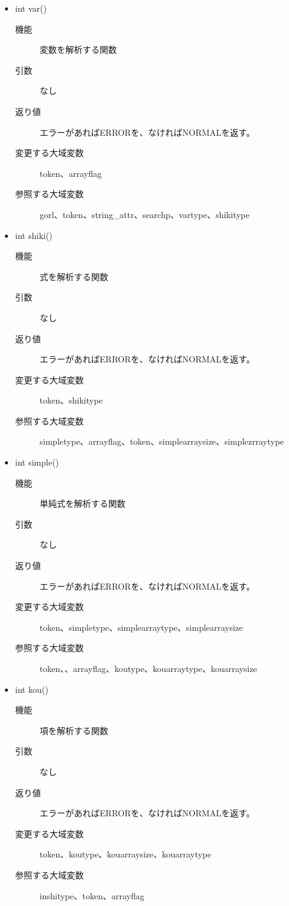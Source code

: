 \documentclass{jarticle}
\begin{document}
\begin{itemize}
\begin{description}
\item[変更する大域変数]token
\item[参照する大域変数]vartype、shikitype、token
\end{description}
\item int var()
\begin{description}
\item[機能]変数を解析する関数
\item[引数]なし
\item[返り値]エラーがあればERRORを、なければNORMALを返す。
\item[変更する大域変数]token、arrayflag
\item[参照する大域変数]gorl、token、string\_attr、searchp、vartype、shikitype
\end{description}
\item int shiki()
\begin{description}
\item[機能]式を解析する関数
\item[引数]なし
\item[返り値]エラーがあればERRORを、なければNORMALを返す。
\item[変更する大域変数]token、shikitype
\item[参照する大域変数]simpletype、arrayflag、token、simplearraysize、simplezrraytype
\end{description}
\item int simple()
\begin{description}
\item[機能]単純式を解析する関数
\item[引数]なし
\item[返り値]エラーがあればERRORを、なければNORMALを返す。
\item[変更する大域変数]token、simpletype、simplearraytype、simplearraysize
\item[参照する大域変数]token、、arrayflag、koutype、kouarraytype、kouarraysize
\end{description}
\item int kou()
\begin{description}
\item[機能]項を解析する関数
\item[引数]なし
\item[返り値]エラーがあればERRORを、なければNORMALを返す。
\item[変更する大域変数]token、koutype、kouarraysize、kouarraytype
\item[参照する大域変数]inshitype、token、arrayflag
\end{description}

\end{itemize}
\end{document}
